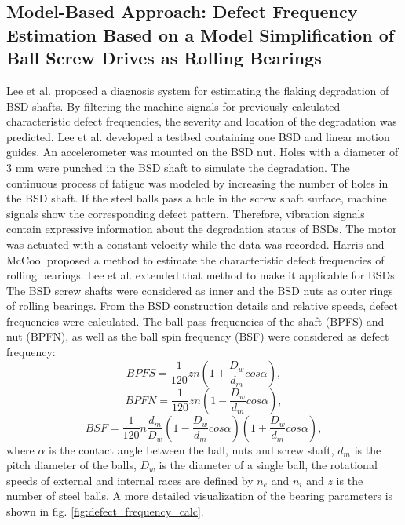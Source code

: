 \subsection{Model-Based Approach: Defect Frequency Estimation Based on a Model Simplification of Ball Screw Drives as Rolling Bearings}
Lee et al. \cite{Lee2015} proposed a diagnosis system for estimating the flaking degradation of BSD shafts. By filtering the machine signals for previously calculated characteristic defect frequencies, the severity and location of the degradation was predicted. Lee et al. developed a testbed containing one BSD and linear motion guides. An accelerometer was mounted on the BSD nut. Holes with a diameter of 3 mm were punched in the BSD shaft to simulate the degradation. The continuous process of fatigue was modeled by increasing the number of holes in the BSD shaft. If the steel balls pass a hole in the screw shaft surface, machine signals show the corresponding defect pattern. Therefore, vibration signals contain expressive information about the degradation status of BSDs. The motor was actuated with a constant velocity while the data was recorded. Harris and McCool \cite{Harris1996} proposed a method to estimate the characteristic defect frequencies of rolling bearings. Lee et al. \cite{Lee2015} extended that method to make it applicable for BSDs. The BSD screw shafts were considered as inner and the BSD nuts as outer rings of rolling bearings. From the BSD construction details and relative speeds, defect frequencies were calculated. The ball pass frequencies of the shaft (BPFS) and nut (BPFN), as well as the ball spin frequency (BSF) were considered as defect frequency: 
\begin{equation}
    BPFS = \frac{1}{120}zn(1+\frac{D_{w}}{d_{m}}cos\alpha),
    \label{eq:defect_frequency}
\end{equation}
\begin{equation}
    BPFN = \frac{1}{120}zn(1-\frac{D_{w}}{d_{m}}cos\alpha),
\end{equation}
\begin{equation}
    BSF = \frac{1}{120}n\frac{d_{m}}{D_{w}} (1-\frac{D_{w}}{d_{m}}cos\alpha)(1+\frac{D_{w}}{d_{m}}cos\alpha) ,
\end{equation}
where $\alpha$ is the contact angle between the ball, nuts and screw shaft, $d_{m}$ is the pitch diameter of the balls, $D_{w}$ is the diameter of a single ball, the rotational speeds of external and internal races are defined by $n_{e}$ and $n_{i}$ and $z$ is the number of steel balls. A more detailed visualization of the bearing parameters is shown in fig. \ref{fig:defect_frequency_calc}. 

